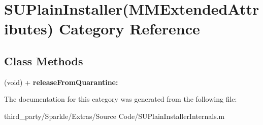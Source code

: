 \hypertarget{category_s_u_plain_installer_07_m_m_extended_attributes_08}{}\section{S\+U\+Plain\+Installer(M\+M\+Extended\+Attributes) Category Reference}
\label{category_s_u_plain_installer_07_m_m_extended_attributes_08}
\subsection*{Class Methods}
\begin{DoxyCompactItemize}
\item 
\mbox{\label{category_s_u_plain_installer_07_m_m_extended_attributes_08_a46685f1558c32b776e83450236926091}} 
(void) + {\bfseries release\+From\+Quarantine\+:}
\end{DoxyCompactItemize}


The documentation for this category was generated from the following file\+:\begin{DoxyCompactItemize}
\item 
third\+\_\+party/\+Sparkle/\+Extras/\+Source Code/S\+U\+Plain\+Installer\+Internals.\+m\end{DoxyCompactItemize}
